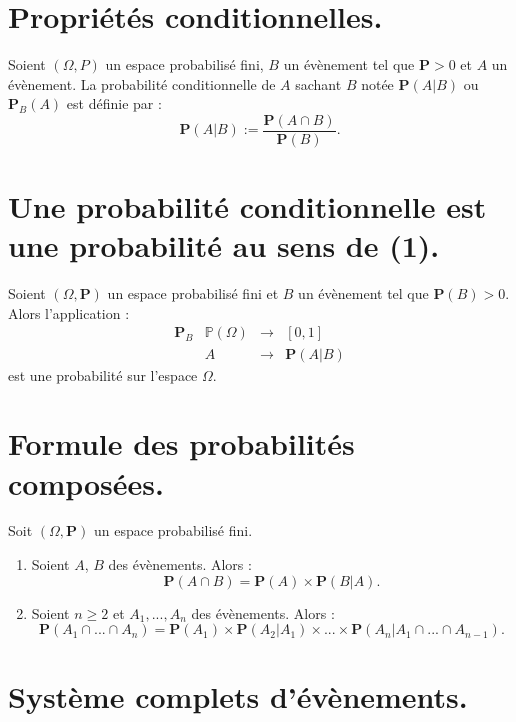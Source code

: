 \documentclass{article}
\begin{document}
\section{Propriétés conditionnelles.}

Soient $(\Omega, P)$ un espace probabilisé fini, $B$ un évènement tel que $\mathbf{P} > 0$ et $A$ un évènement. La probabilité conditionnelle de $A$ sachant $B$ notée $\mathbf{P}(A|B)$ ou $\mathbf{P}_B(A)$ est définie par :
\[\mathbf{P}(A|B) :=  \dfrac{\mathbf{P}(A \cap B)}{\mathbf{P}(B)}. \] %

\section{Une probabilité conditionnelle est une probabilité au sens de (1).}

Soient $(\Omega, \mathbf{P})$ un espace probabilisé fini et $B$ un évènement tel que $\mathbf{P}(B) > 0$. Alors l'application : 
\[
\begin{array}{c|ccc}
    \mathbf{P}_B & \mathbb{P}(\Omega) & \longrightarrow & [0,1]
    \\[0.3em]
                 & A                  & \longrightarrow & \mathbf{P}(A|B)
\end{array}
\]
est une probabilité sur l'espace $\Omega$.

\section{Formule des probabilités composées.}

Soit $(\Omega, \mathbf{P})$ un espace probabilisé fini.

\begin{enumerate}[label=(\alph*)]
    \item Soient $A$, $B$ des évènements. Alors : 
    \[
        \mathbf{P}(A \cap B) = \mathbf{P}(A) \times \mathbf{P}(B|A).
    \]
    \item Soient $n \geq 2$ et $A_1, ..., A_n$ des évènements. Alors : 
    \[
        \mathbf{P}(A_1 \cap ... \cap A_n) = \mathbf{P}(A_1) \times \mathbf{P}(A_2 | A_1) \times ... \times \mathbf{P}(A_n | A_1 \cap ... \cap A_{n-1}).
    \]
\end{enumerate}

\section{Système complets d'évènements.}
\end{document}
